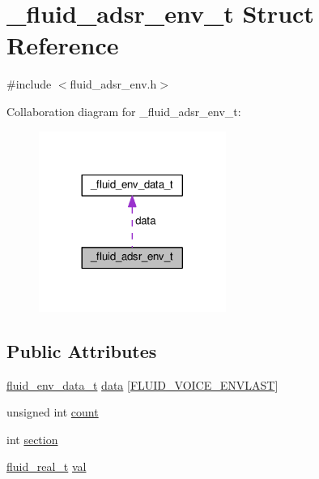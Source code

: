 \hypertarget{struct__fluid__adsr__env__t}{}\section{\+\_\+fluid\+\_\+adsr\+\_\+env\+\_\+t Struct Reference}
\label{struct__fluid__adsr__env__t}


{\ttfamily \#include $<$fluid\+\_\+adsr\+\_\+env.\+h$>$}



Collaboration diagram for \+\_\+fluid\+\_\+adsr\+\_\+env\+\_\+t\+:
\nopagebreak
\begin{figure}[H]
\begin{center}
\leavevmode
\includegraphics[width=173pt]{struct__fluid__adsr__env__t__coll__graph}
\end{center}
\end{figure}
\subsection*{Public Attributes}
\begin{DoxyCompactItemize}
\item 
\hyperlink{fluidsynth__priv_8h_a3d2015ae1e5cd199777e135fed953e55}{fluid\+\_\+env\+\_\+data\+\_\+t} \hyperlink{struct__fluid__adsr__env__t_a663a2e9bce9e50ee402c556d2988ab02}{data} \mbox{[}\hyperlink{fluid__adsr__env_8h_a92b014c78f2846df56c8c4c7bc6cdf2ea3a5528ce6cf74fbf1335d61ce182a30a}{F\+L\+U\+I\+D\+\_\+\+V\+O\+I\+C\+E\+\_\+\+E\+N\+V\+L\+A\+ST}\mbox{]}
\item 
unsigned int \hyperlink{struct__fluid__adsr__env__t_ab3fffe4cb8b32f25e42b1c2087221f97}{count}
\item 
int \hyperlink{struct__fluid__adsr__env__t_a098e9a731878eb855371463f68a8cec9}{section}
\item 
\hyperlink{fluidsynth__priv_8h_a9e96f0917747b69cabb7c671bc693dbb}{fluid\+\_\+real\+\_\+t} \hyperlink{struct__fluid__adsr__env__t_a37b3cdde99bb8aaf9d8352c2f31bb7ee}{val}
\end{DoxyCompactItemize}


